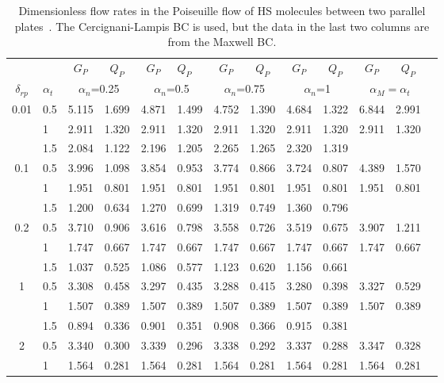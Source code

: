 \begin{table}
	\centering
	\caption{Dimensionless flow rates in the Poiseuille flow of HS molecules between two parallel plates~\cite{WuStruchtrupJFM2017}. The Cercignani-Lampis BC is used, but the data in the last two columns are from the Maxwell BC. }
\begin{tabular}{clccclccccccc}
	\hline
	&  & ${G}_P$ & ${Q}_P$ & ${G}_P$ & ${Q}_P$ & ${G}_P$ & ${Q}_P$ & ${G}_P$
	& ${Q}_P$ & ${G}_P$ & ${Q}_P$   \\ 
	$\delta_{rp}$ & $\alpha_t$ & \multicolumn{2}{c}{$\alpha_n$=0.25} & 
	\multicolumn{2}{c}{$\alpha_n$=0.5} & \multicolumn{2}{c}{$\alpha_n$=0.75} & 
	\multicolumn{2}{c}{$\alpha_n$=1} & \multicolumn{2}{c}{$\alpha_M=\alpha_t$} 
	\\ 
	\hline
	0.01 & 0.5 & 5.115 & 1.699 & 4.871 & 1.499 & 4.752 & 1.390 & 4.684 & 1.322 & 
	6.844 & 2.991   \\ 
	& 1 & 2.911 & 1.320 & 2.911 & 1.320 & 2.911 & 1.320 & 2.911 & 1.320 & 2.911
	& 1.320   \\ 
	& 1.5 & 2.084 & 1.122 & 2.196 & 1.205 & 2.265 & 1.265 & 2.320 & 1.319 &  & 
	  \\ 
	0.1 & 0.5 & 3.996 & 1.098 & 3.854 & 0.953 & 3.774 & 0.866 & 3.724 & 0.807 & 
	4.389 & 1.570   \\ 
	& 1 & 1.951 & 0.801 & 1.951 & 0.801 & 1.951 & 0.801 & 1.951 & 0.801 & 1.951
	& 0.801   \\ 
	& 1.5 & 1.200 & 0.634 & 1.270 & 0.699 & 1.319 & 0.749 & 1.360 & 0.796 &  &   \\ 
	0.2 & 0.5 & 3.710 & 0.906 & 3.616 & 0.798 & 3.558 & 0.726 & 3.519 & 0.675 & 
	3.907 & 1.211   \\ 
	& 1 & 1.747 & 0.667 & 1.747 & 0.667 & 1.747 & 0.667 & 1.747 & 0.667 & 1.747
	& 0.667   \\ 
	& 1.5 & 1.037 & 0.525 & 1.086 & 0.577 & 1.123 & 0.620 & 1.156 & 0.661 &  &   \\ 
	1 & 0.5 & 3.308 & 0.458 & 3.297 & 0.435 & 3.288 & 0.415 & 3.280 & 0.398 & 
	3.327 & 0.529   \\ 
	& 1 & 1.507 & 0.389 & 1.507 & 0.389 & 1.507 & 0.389 & 1.507 & 0.389 & 1.507
	& 0.389   \\ 
	& 1.5 & 0.894 & 0.336 & 0.901 & 0.351 & 0.908 & 0.366 & 0.915 & 0.381 &  &   \\ 
	2 & 0.5 & 3.340 & 0.300 & 3.339 & 0.296 & 3.338 & 0.292 & 3.337 & 0.288 & 
	3.347 & 0.328   \\ 
	& 1 & 1.564 & 0.281 & 1.564 & 0.281 & 1.564 & 0.281 & 1.564 & 0.281 & 1.564
	& 0.281   \\ 

\end{tabular}
\end{table}
